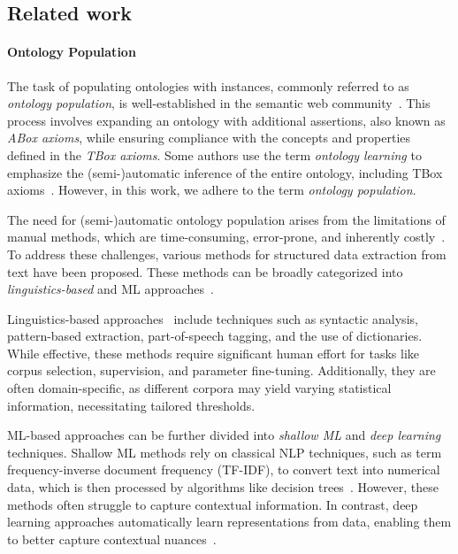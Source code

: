 \subsection{Related work}
\label{subsec:related-work-kgfiller}

\paragraph{Ontology Population}
\label{par:related-workd-ontology-population}
%
The task of populating ontologies with instances, commonly referred to as \emph{ontology population}, is well-established in the semantic web community~\cite{placeholder}.
%
This process involves expanding an ontology with additional assertions, also known as \emph{ABox axioms}, while ensuring compliance with the concepts and properties defined in the \emph{TBox axioms}.
%
Some authors use the term \emph{ontology learning} to emphasize the (semi-)automatic inference of the entire ontology, including TBox axioms~\cite{placeholder}.
%
However, in this work, we adhere to the term \emph{ontology population}.


The need for (semi-)automatic ontology population arises from the limitations of manual methods, which are time-consuming, error-prone, and inherently costly~\cite{placeholder}.
%
To address these challenges, various methods for structured data extraction from text have been proposed.
%
These methods can be broadly categorized into \emph{linguistics-based} and \gls{ML} approaches~\cite{placeholder}.


Linguistics-based approaches~\cite{placeholder} include techniques such as syntactic analysis, pattern-based extraction, part-of-speech tagging, and the use of dictionaries.
%
While effective, these methods require significant human effort for tasks like corpus selection, supervision, and parameter fine-tuning.
%
Additionally, they are often domain-specific, as different corpora may yield varying statistical information, necessitating tailored thresholds.


ML-based approaches can be further divided into \emph{shallow \gls{ML}} and \emph{deep learning} techniques.
%
Shallow ML methods rely on classical \gls{NLP} techniques, such as term frequency-inverse document frequency (TF-IDF), to convert text into numerical data, which is then processed by algorithms like decision trees~\cite{placeholder}.
%
However, these methods often struggle to capture contextual information.
%
In contrast, deep learning approaches automatically learn representations from data, enabling them to better capture contextual nuances~\cite{placeholder}.


